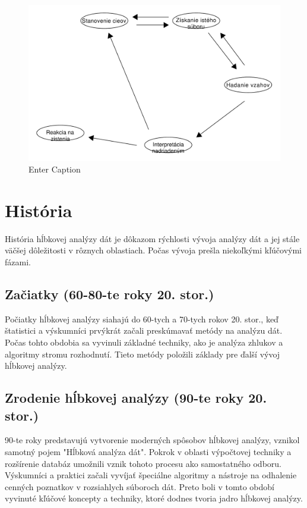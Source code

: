 \documentclass[10pt,twoside,slovak,a4paper]{article}
\begin{document}
\begin{figure}
    \includegraphics[width=1\linewidth]{diagram datamining.pdf}
    \caption{Enter Caption}
\end{figure}

\section{História}
História hĺbkovej analýzy dát je dôkazom rýchlosti vývoja analýzy dát a jej stále väčšej dôležitosti v rôznych oblastiach. Počas vývoja prešla niekoľkými kľúčovými fázami.

\subsection{Začiatky (60-80-te roky 20. stor.)} 
Počiatky hĺbkovej analýzy siahajú do 60-tych a 70-tych rokov 20. stor., keď štatistici a výskumníci prvýkrát začali preskúmavať metódy na analýzu dát.
Počas tohto obdobia sa vyvinuli základné techniky, ako je analýza zhlukov a algoritmy stromu rozhodnutí. Tieto metódy položili základy pre ďalší vývoj hĺbkovej analýzy.

\subsection{Zrodenie hĺbkovej analýzy (90-te roky 20. stor.)} 
90-te roky predstavujú vytvorenie moderných spôsobov hĺbkovej analýzy, vznikol samotný pojem "Hĺbková analýza dát". Pokrok v oblasti výpočtovej techniky a rozšírenie databáz umožnili vznik tohoto procesu ako samostatného odboru. Výskumníci a praktici začali vyvíjať špeciálne algoritmy a nástroje na odhalenie cenných poznatkov v rozsiahlych súboroch dát. Preto boli v tomto období vyvinuté kľúčové koncepty a techniky, ktoré dodnes tvoria jadro hĺbkovej analýzy.
\end{document}
